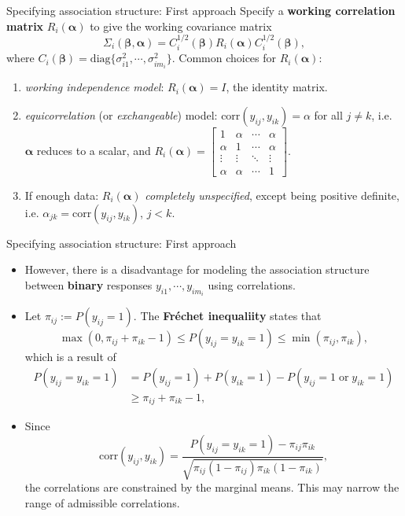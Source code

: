 \documentclass{beamer}
\newcommand{\boldbeta}{{\boldsymbol \beta}}
\newcommand{\boldalpha}{{\boldsymbol \alpha}}
\begin{document}
\begin{frame}{\large Specifying association structure: First approach}
 Specify a 
\textbf{working correlation matrix} $R_i(\boldalpha)$ to give the working
covariance matrix 
\[
\Sigma_i(\boldbeta, \boldalpha)=C_i^{1/2}(\boldbeta)
R_i(\boldalpha)C_i^{1/2}(\boldbeta),
\]
where $C_i(\boldbeta)
=\text{diag}\{\sigma_{i1}^2,\cdots, \sigma_{im_i}^2\}$. Common choices for $R_i(\boldalpha)$:
\begin{enumerate}
\item
\emph{working independence model}: $R_i(\boldalpha)=I$, the identity matrix.
\item
\emph{equicorrelation} (or \emph{exchangeable}) model: $\mbox{corr}(y_{ij}, y_{ik})=\alpha$ for 
all $j\neq k$, i.e. $\boldalpha$ reduces to  a scalar, and {\footnotesize
$\displaystyle R_i(\boldalpha)=\left[\begin{array}{cccc} 1 & \alpha & \cdots & \alpha
\\ \alpha & 1 & \cdots & \alpha \\ \vdots & \vdots & \ddots & \vdots \\ \alpha & \alpha & \cdots & 1\end{array}\right]$.}
\item
If enough data: $R_i(\boldalpha)$ \emph{completely unspecified}, except being positive definite, i.e. 
$\alpha_{jk}=\text{corr}(y_{ij}, y_{ik})$, $j<k$.
\end{enumerate}
\end{frame}


\begin{frame}{\large Specifying association structure: First approach}
\begin{itemize}
\item However, there is a disadvantage for modeling the association structure between {\bf binary} responses $y_{i1},\cdots, y_{im_i}$ using correlations. 



\item  Let $\pi_{ij} := P(y_{ij} =1)$. The {\bf Fr\'echet inequaliity} states that 
\[
\max (0, \pi_{ij}+\pi_{ik}-1) \leq   P(y_{ij}=y_{ik}=1)\leq \min (\pi_{ij}, \pi_{ik}),
\]
which is a result of 
\begin{align*}
  P(y_{ij}=y_{ik}=1) &= P(y_{ij}=1)+P(y_{ik}=1)-P(y_{ij}=1 \;\mbox{or}\; y_{ik}=1)\\
  &\geq \pi_{ij}+\pi_{ik}-1,
\end{align*}


\item

Since 
\[
\mbox{corr}(y_{ij}, y_{ik})=\frac{P(y_{ij}=y_{ik}=1)-\pi_{ij}\pi_{ik}}{\sqrt{\pi_{ij}(1-\pi_{ij})\pi_{ik}(1-\pi_{ik})}},
\]
the correlations are constrained by the marginal means. This may narrow the range of admissible correlations. 



\end{itemize}
\end{frame}
\end{document}
